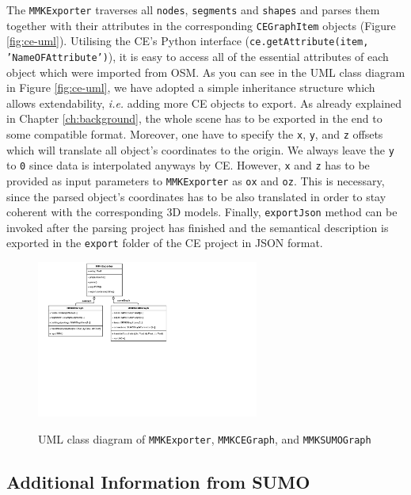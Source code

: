 The \texttt{MMKExporter} traverses all \texttt{nodes}, \texttt{segments} and \texttt{shapes} and parses them together with their attributes in the corresponding \texttt{CEGraphItem} objects (Figure \ref{fig:ce-uml}). Utilising the CE's Python interface (\texttt{ce.getAttribute(item, 'NameOFAttribute')}), it is easy to access all of the essential attributes of each object which were imported from OSM. As you can see in the UML class diagram in Figure \ref{fig:ce-uml}, we have adopted a simple inheritance structure which allows extendability, \emph{i.e.} adding more CE objects to export. As already explained in Chapter \ref{ch:background}, the whole scene has to be exported in the end to some compatible format. Moreover, one have to specify the \texttt{x}, \texttt{y}, and \texttt{z} offsets which will translate all object's coordinates to the origin. We always leave the \texttt{y} to \texttt{0} since data is interpolated anyways by CE. However, \texttt{x} and \texttt{z} has to be provided as input parameters to \texttt{MMKExporter} as \texttt{ox} and \texttt{oz}. This is necessary, since the parsed object's coordinates has to be also translated in order to stay coherent with the corresponding 3D models. Finally, \texttt{exportJson} method can be invoked after the parsing project has finished and the semantical description is exported in the \texttt{export} folder of the CE project in JSON format.

\begin{figure}[htb]
	\centering
	\includegraphics[width=0.65\textwidth]{figures/ce-overview-uml}
	\label{fig:ce-overview-uml}
	\caption{UML class diagram of \texttt{MMKExporter}, \texttt{MMKCEGraph}, and  \texttt{MMKSUMOGraph}}
\end{figure}

\subsection{Additional Information from SUMO}

